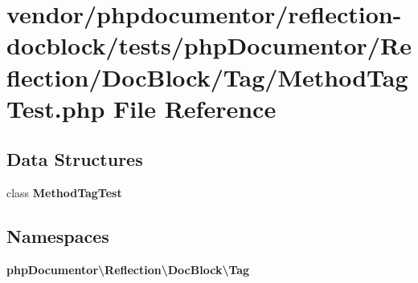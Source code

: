 \section{vendor/phpdocumentor/reflection-\/docblock/tests/php\+Documentor/\+Reflection/\+Doc\+Block/\+Tag/\+Method\+Tag\+Test.php File Reference}
\label{_method_tag_test_8php}
\subsection*{Data Structures}
\begin{DoxyCompactItemize}
\item 
class {\bf Method\+Tag\+Test}
\end{DoxyCompactItemize}
\subsection*{Namespaces}
\begin{DoxyCompactItemize}
\item 
 {\bf php\+Documentor\textbackslash{}\+Reflection\textbackslash{}\+Doc\+Block\textbackslash{}\+Tag}
\end{DoxyCompactItemize}
